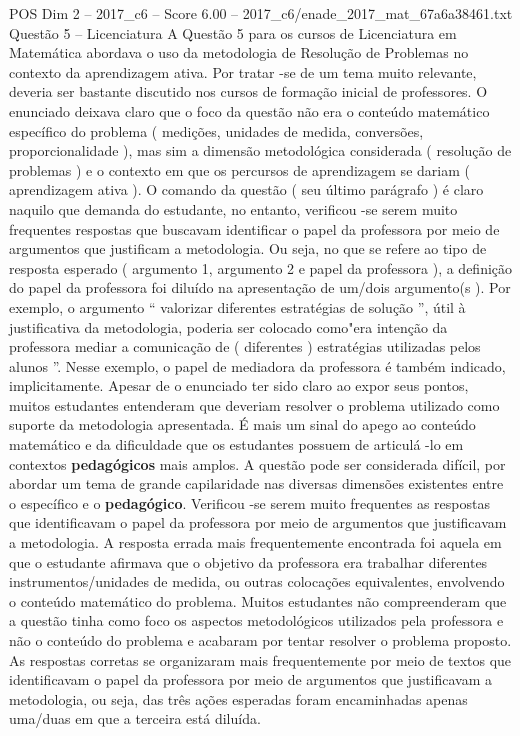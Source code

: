 \begin{textsample}{POS Dim 2 – 2017\_c6 – Score 6.00 – 2017\_c6/enade\_2017\_mat\_67a6a38461.txt}
Questão 5 – Licenciatura A Questão 5 para os cursos de Licenciatura em Matemática abordava o uso da metodologia de Resolução de Problemas no contexto da aprendizagem ativa.
Por tratar -se de um tema muito relevante, deveria ser bastante discutido nos cursos de formação inicial de professores.
O enunciado deixava claro que o foco da questão não era o conteúdo matemático específico do problema ( medições, unidades de medida, conversões, proporcionalidade ), mas sim a dimensão metodológica considerada ( resolução de problemas ) e o contexto em que os percursos de aprendizagem se dariam ( aprendizagem ativa ).
O comando da questão ( seu último parágrafo ) é claro naquilo que demanda do estudante, no entanto, verificou -se serem muito frequentes respostas que buscavam identificar o papel da professora por meio de argumentos que justificam a metodologia.
Ou seja, no que se refere ao tipo de resposta esperado ( argumento 1, argumento 2 e papel da professora ), a definição do papel da professora foi diluído na apresentação de um/dois argumento(s ).
Por exemplo, o argumento “ valorizar diferentes estratégias de solução ”, útil à justificativa da metodologia, poderia ser colocado como"era intenção da professora mediar a comunicação de ( diferentes ) estratégias utilizadas pelos alunos ”.
Nesse exemplo, o papel de mediadora da professora é também indicado, implicitamente.
Apesar de o enunciado ter sido claro ao expor seus pontos, muitos estudantes entenderam que deveriam resolver o problema utilizado como suporte da metodologia apresentada.
É mais um sinal do apego ao conteúdo matemático e da dificuldade que os estudantes possuem de articulá -lo em contextos \textbf{pedagógicos} mais amplos.
A questão pode ser considerada difícil, por abordar um tema de grande capilaridade nas diversas dimensões existentes entre o específico e o \textbf{pedagógico}.
Verificou -se serem muito frequentes as respostas que identificavam o papel da professora por meio de argumentos que justificavam a metodologia.
A resposta errada mais frequentemente encontrada foi aquela em que o estudante afirmava que o objetivo da professora era trabalhar diferentes instrumentos/unidades de medida, ou outras colocações equivalentes, envolvendo o conteúdo matemático do problema.
Muitos estudantes não compreenderam que a questão tinha como foco os aspectos metodológicos utilizados pela professora e não o conteúdo do problema e acabaram por tentar resolver o problema proposto.
As respostas corretas se organizaram mais frequentemente por meio de textos que identificavam o papel da professora por meio de argumentos que justificavam a metodologia, ou seja, das três ações esperadas foram encaminhadas apenas uma/duas em que a terceira está diluída.

\end{textsample}
